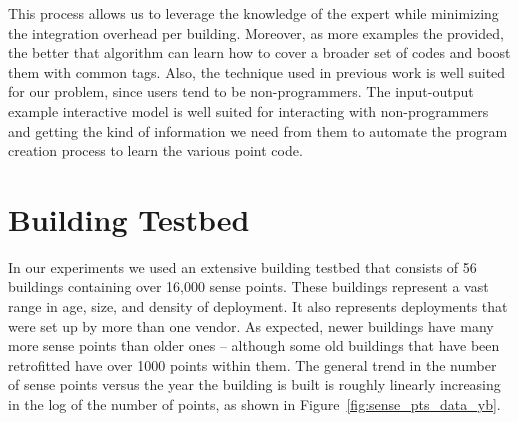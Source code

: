 This process allows us to leverage the knowledge of the expert while minimizing the integration
overhead per building.  Moreover, as more examples the provided, the better that 
algorithm can learn how to cover a broader set of codes and boost them with common tags.
Also, the technique used in previous work is well suited for our problem, since
users tend to be non-programmers.  The input-output example interactive model is well suited
for interacting with non-programmers and getting the kind of information we need from them
to automate the program creation process to learn the various point code. 



\section{Building Testbed}
In our experiments we used an extensive building testbed that 
consists of 56 buildings containing over 16,000 sense points. These buildings 
represent a vast range in age, size, and density of deployment.  It also represents deployments
that were set up by more than one vendor.  As expected, newer buildings have many more sense 
points than older ones -- although some old buildings that have been retrofitted have over 1000  
points within them. The general trend in the number of sense points versus the year the 
building is built is roughly linearly increasing in the log of the number of points, as shown
in Figure~\ref{fig:sense_pts_data_yb}.  

